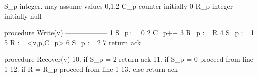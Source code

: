 
S_p integer. may assume values 0,1,2
C_p counter initially 0
R_p integer initially null


procedure Write(v)
------------------
1 S_p: = 0
2 C_p++
3 R_p := R
4 S_p := 1
5 R := <v,p,C_p>
6 S_p := 2
7 return ack

procedure Recover(v)
10. if S_p = 2 return ack
11. if S_p = 0 proceed from line 1
12. if R = R_p proceed from line 1
13. else return ack




